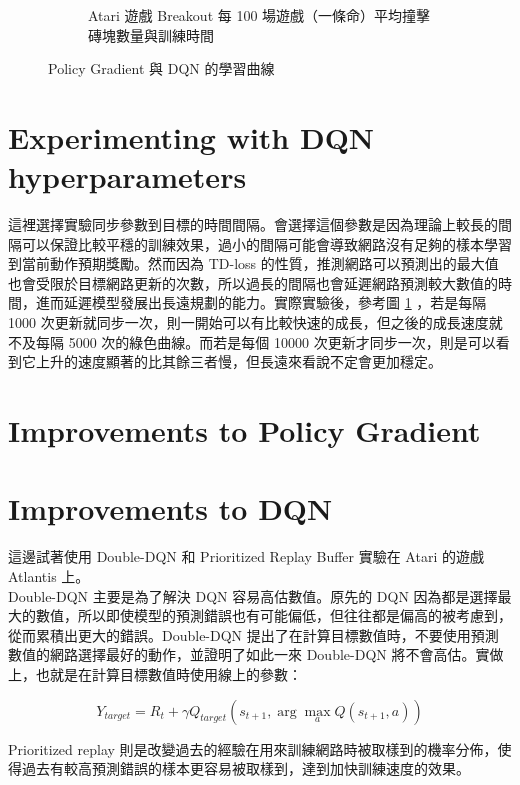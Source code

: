 \documentclass[fleqn,a4paper,12pt]{article}
\begin{document}
\begin{figure}[h]
\begin{subfigure}{.45\textwidth}
  \caption{Atari 遊戲 Breakout 每 100 場遊戲（一條命）平均撞擊磚塊數量與訓練時間}
  \label{fig:learning-curve-dqn}
\end{subfigure}
\label{fig:learning-curve}
\caption{Policy Gradient 與 DQN 的學習曲線}
\end{figure}


\section{Experimenting with DQN hyperparameters}

這裡選擇實驗同步參數到目標的時間間隔。會選擇這個參數是因為理論上較長的間隔可以保證比較平穩的訓練效果，過小的間隔可能會導致網路沒有足夠的樣本學習到當前動作預期獎勵。然而因為 TD-loss 的性質，推測網路可以預測出的最大值也會受限於目標網路更新的次數，所以過長的間隔也會延遲網路預測較大數值的時間，進而延遲模型發展出長遠規劃的能力。實際實驗後，參考圖 \ref{fig:learning-curve-dqn} ，若是每隔 1000 次更新就同步一次，則一開始可以有比較快速的成長，但之後的成長速度就不及每隔 5000 次的綠色曲線。而若是每個 10000 次更新才同步一次，則是可以看到它上升的速度顯著的比其餘三者慢，但長遠來看說不定會更加穩定。

\section{Improvements to Policy Gradient}

\section{Improvements to DQN}

這邊試著使用 Double-DQN 和 Prioritized Replay Buffer 實驗在 Atari 的遊戲 Atlantis 上。\\

Double-DQN 主要是為了解決 DQN 容易高估數值。原先的 DQN 因為都是選擇最大的數值，所以即使模型的預測錯誤也有可能偏低，但往往都是偏高的被考慮到，從而累積出更大的錯誤。Double-DQN 提出了在計算目標數值時，不要使用預測數值的網路選擇最好的動作，並證明了如此一來 Double-DQN 將不會高估。實做上，也就是在計算目標數值時使用線上的參數：

\begin{equation*}
  Y_{target} = R_t + \gamma Q_{target}(s_{t+1}, \arg \max_a Q(s_{t+1}, a))
\end{equation*}


Prioritized replay 則是改變過去的經驗在用來訓練網路時被取樣到的機率分佈，使得過去有較高預測錯誤的樣本更容易被取樣到，達到加快訓練速度的效果。\\
\end{document}
